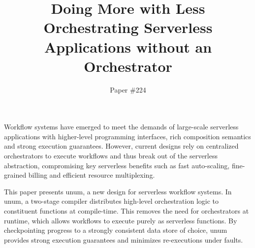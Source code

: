\documentclass[letterpaper,twocolumn,10pt]{article}
\newcommand{\name}{unum}
\begin{document}

\date{}

\title{Doing More with Less \\ Orchestrating Serverless Applications
without an Orchestrator}

\author{
  Paper \#224
} %

\maketitle
\thispagestyle{empty}

\abstract

Workflow systems  have emerged to meet the demands of large-scale serverless
applications with higher-level programming interfaces, rich composition
semantics and strong execution guarantees. However, current designs rely on
centralized orchestrators to execute workflows and thus break out of
the serverless abstraction, compromising key serverless benefits such as fast
auto-scaling, fine-grained billing and efficient resource multiplexing. 

This paper presents \name{}, a new design for serverless workflow systems. 
In \name{}, a two-stage compiler distributes high-level orchestration
logic to constituent functions at compile-time. 
This removes the need for orchestrators at runtime, which allows workflows to 
execute purely as serverless functions. 
By checkpointing progress to a strongly consistent data store 
of choice, \name{} provides strong execution guarantees 
and minimizes re-executions under faults. 
\end{document}
